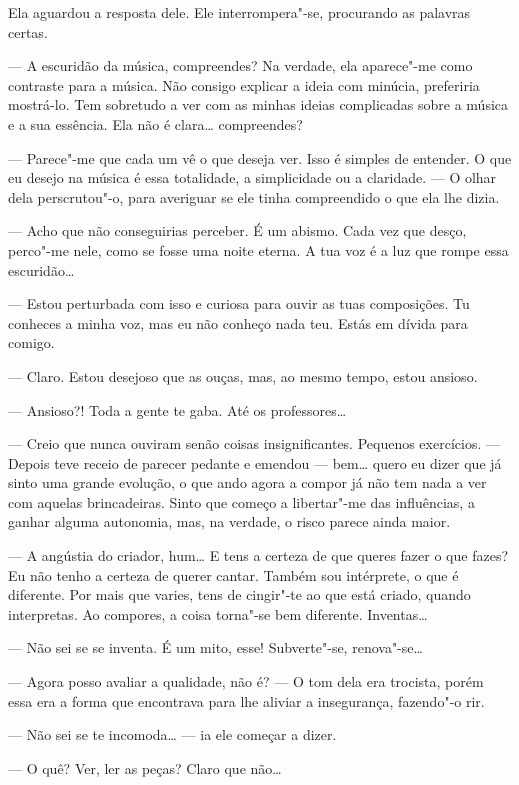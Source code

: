 Ela aguardou a resposta dele. Ele interrompera"-se, procurando as
palavras certas.

--- A escuridão da música, compreendes? Na verdade, ela aparece"-me como
contraste para a música. Não consigo explicar a ideia com minúcia,
preferiria mostrá-lo. Tem sobretudo a ver com as minhas ideias
complicadas sobre a música e a sua essência. Ela não é
clara\ldots{} compreendes?

--- Parece"-me que cada um vê o que deseja ver. Isso é simples de entender.
O que eu desejo na música é essa totalidade, a simplicidade ou a
claridade. --- O olhar dela perscrutou"-o, para averiguar se ele tinha
compreendido o que ela lhe dizia.

--- Acho que não conseguirias perceber. É um abismo. Cada vez que desço,
perco"-me nele, como se fosse uma noite eterna. A tua voz é a luz que
rompe essa escuridão\ldots{}

--- Estou perturbada com isso e curiosa para ouvir as tuas composições. Tu
conheces a minha voz, mas eu não conheço nada teu. Estás em dívida para
comigo.

--- Claro. Estou desejoso que as ouças, mas, ao mesmo tempo, estou
ansioso.

--- Ansioso?! Toda a gente te gaba. Até os professores\ldots{}

--- Creio que nunca ouviram senão coisas insignificantes. Pequenos
exercícios. --- Depois teve receio de parecer pedante e emendou ---
bem\ldots{} quero eu dizer que já sinto uma grande evolução, o que ando agora
a compor já não tem nada a ver com aquelas brincadeiras. Sinto que
começo a libertar"-me das influências, a ganhar alguma autonomia, mas, na
verdade, o risco parece ainda maior.

--- A angústia do criador, hum\ldots{} E tens a certeza de que queres fazer o
que fazes? Eu não tenho a certeza de querer cantar. Também sou
intérprete, o que é diferente. Por mais que varies, tens de cingir"-te ao
que está criado, quando interpretas. Ao compores, a coisa torna"-se bem
diferente. Inventas\ldots{}

--- Não sei se se inventa. É um mito, esse! Subverte"-se, renova"-se\ldots{}

--- Agora posso avaliar a qualidade, não é? --- O tom dela era trocista,
porém essa era a forma que encontrava para lhe aliviar a insegurança,
fazendo"-o rir.

--- Não sei se te incomoda\ldots{} --- ia ele começar a dizer.

--- O quê? Ver, ler as peças? Claro que não\ldots{}


